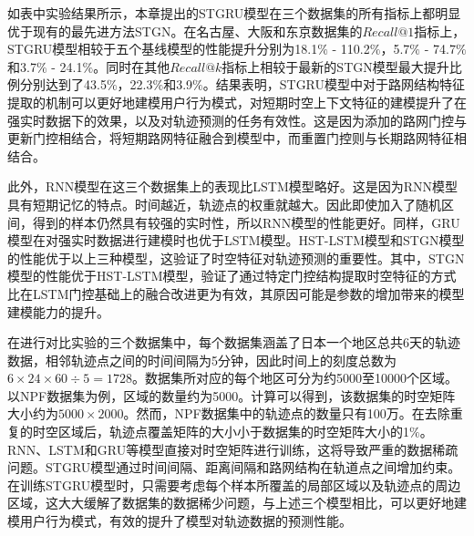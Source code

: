 \documentclass[master]{thesis-uestc}
\begin{document}
如表中实验结果所示，本章提出的STGRU模型在三个数据集的所有指标上都明显优于现有的最先进方法STGN。在名古屋、大阪和东京数据集的$Recall@1$指标上，STGRU模型相较于五个基线模型的性能提升分别为18.1$\%$ - 110.2$\%$，5.7$\%$ - 74.7$\%$和3.7$\%$ - 24.1$\%$。同时在其他$Recall@k$指标上相较于最新的STGN模型最大提升比例分别达到了43.5$\%$，22.3$\%$和3.9$\%$。结果表明，STGRU模型中对于路网结构特征提取的机制可以更好地建模用户行为模式，对短期时空上下文特征的建模提升了在强实时数据下的效果，以及对轨迹预测的任务有效性。这是因为添加的路网门控与更新门控相结合，将短期路网特征融合到模型中，而重置门控则与长期路网特征相结合。

此外，RNN模型在这三个数据集上的表现比LSTM模型略好。这是因为RNN模型具有短期记忆的特点。时间越近，轨迹点的权重就越大。因此即使加入了随机区间，得到的样本仍然具有较强的实时性，所以RNN模型的性能更好。同样，GRU模型在对强实时数据进行建模时也优于LSTM模型。HST-LSTM模型和STGN模型的性能优于以上三种模型，这验证了时空特征对轨迹预测的重要性。其中，STGN模型的性能优于HST-LSTM模型，验证了通过特定门控结构提取时空特征的方式比在LSTM门控基础上的融合改进更为有效，其原因可能是参数的增加带来的模型建模能力的提升。

在进行对比实验的三个数据集中，每个数据集涵盖了日本一个地区总共6天的轨迹数据，相邻轨迹点之间的时间间隔为5分钟，因此时间上的刻度总数为$6\times 24 \times 60 \div 5 = 1728$。数据集所对应的每个地区可分为约5000至10000个区域。以NPF数据集为例，区域的数量约为5000。计算可以得到，该数据集的时空矩阵大小约为$5000\times 2000$。然而，NPF数据集中的轨迹点的数量只有100万。在去除重复的时空区域后，轨迹点覆盖矩阵的大小小于数据集的时空矩阵大小的1$\%$。RNN、LSTM和GRU等模型直接对时空矩阵进行训练，这将导致严重的数据稀疏问题。STGRU模型通过时间间隔、距离间隔和路网结构在轨道点之间增加约束。在训练STGRU模型时，只需要考虑每个样本所覆盖的局部区域以及轨迹点的周边区域，这大大缓解了数据集的数据稀少问题，与上述三个模型相比，可以更好地建模用户行为模式，有效的提升了模型对轨迹数据的预测性能。
\end{document}
